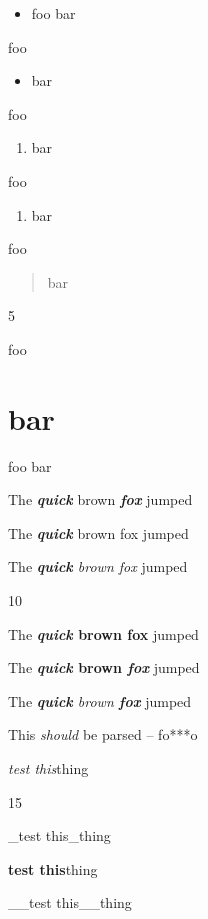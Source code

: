 \begin{itemize}
\item foo
bar

\end{itemize}

foo

\begin{itemize}
\item bar

\end{itemize}

foo

\begin{enumerate}
\item bar

\end{enumerate}

foo

\begin{enumerate}
\item bar

\end{enumerate}

foo

\begin{quote}
bar
\end{quote}

5

foo

\part{bar}
\label{bar}

foo
bar

The \textbf{\emph{quick}} brown \textbf{\emph{fox}} jumped

The \textbf{\emph{quick}} brown fox jumped

The \emph{\textbf{quick} brown fox} jumped

10

The \textbf{\emph{quick} brown fox} jumped

The \textbf{\emph{quick} brown \emph{fox}} jumped

The \emph{\textbf{quick} brown \textbf{fox}} jumped

This \emph{should} be parsed -- fo***o

\emph{test this}thing

15

\_test this\_thing

\textbf{test this}thing

\_\_test this\_\_thing

